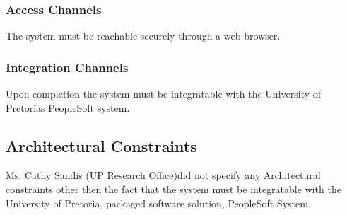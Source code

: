 \documentclass[12pt]{article}
\newcommand{\client}{Ms. Cathy Sandis (UP Research Office)}
\begin{document}
\subsubsection{Access Channels}
The system must be reachable securely through a web browser. 

\subsubsection{Integration Channels}
Upon completion the system must be integratable with the University of Pretorias PeopleSoft system.

\subsection{Architectural Constraints}
\client did not specify any Architectural constraints other then the fact that the system must be integratable with the University of Pretoria, packaged software solution, PeopleSoft System. 

% 
\end{document}
